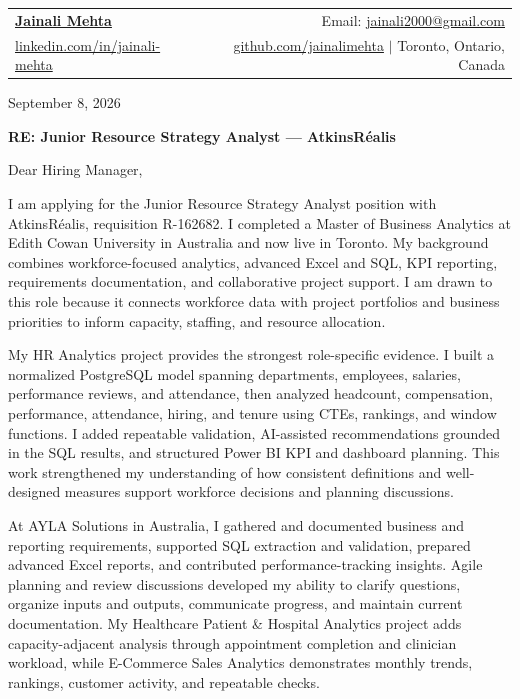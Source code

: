 \documentclass[letterpaper,11pt]{article}
\begin{document}
\begin{tabular*}{\textwidth}{l@{\extracolsep{\fill}}r}
  \textbf{\href{https://www.linkedin.com/in/jainali-mehta}{\Large Jainali Mehta}} & Email: \href{mailto:jainali2000@gmail.com}{jainali2000@gmail.com}\\
  \href{https://www.linkedin.com/in/jainali-mehta}{linkedin.com/in/jainali-mehta} & \href{https://github.com/jainalimehta}{github.com/jainalimehta} $|$ Toronto, Ontario, Canada \\
\end{tabular*}

\hrulefill

\bigbreak
September 8, 2026

\bigbreak
\centerline{\large\textbf{RE: Junior Resource Strategy Analyst --- AtkinsRéalis}}

\bigbreak
Dear Hiring Manager,

\bigbreak
I am applying for the Junior Resource Strategy Analyst position with AtkinsRéalis, requisition R-162682. I completed a Master of Business Analytics at Edith Cowan University in Australia and now live in Toronto. My background combines workforce-focused analytics, advanced Excel and SQL, KPI reporting, requirements documentation, and collaborative project support. I am drawn to this role because it connects workforce data with project portfolios and business priorities to inform capacity, staffing, and resource allocation.

\bigbreak
My HR Analytics project provides the strongest role-specific evidence. I built a normalized PostgreSQL model spanning departments, employees, salaries, performance reviews, and attendance, then analyzed headcount, compensation, performance, attendance, hiring, and tenure using CTEs, rankings, and window functions. I added repeatable validation, AI-assisted recommendations grounded in the SQL results, and structured Power BI KPI and dashboard planning. This work strengthened my understanding of how consistent definitions and well-designed measures support workforce decisions and planning discussions.

\bigbreak
At AYLA Solutions in Australia, I gathered and documented business and reporting requirements, supported SQL extraction and validation, prepared advanced Excel reports, and contributed performance-tracking insights. Agile planning and review discussions developed my ability to clarify questions, organize inputs and outputs, communicate progress, and maintain current documentation. My Healthcare Patient \& Hospital Analytics project adds capacity-adjacent analysis through appointment completion and clinician workload, while E-Commerce Sales Analytics demonstrates monthly trends, rankings, customer activity, and repeatable checks.
\end{document}
